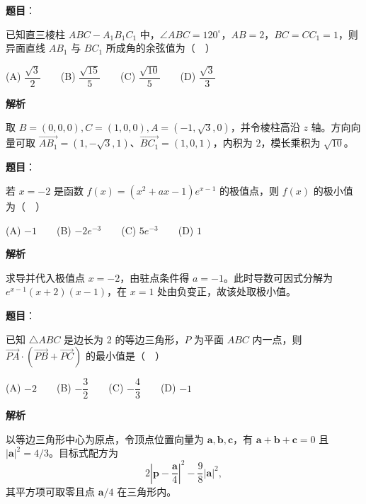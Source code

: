 \begin{answer}

\textbf{题目}：

已知直三棱柱 \(ABC-A_1B_1C_1\) 中，\(\angle ABC=120^\circ\)，\(AB=2\)，\(BC=CC_1=1\)，则异面直线 \(AB_1\) 与 \(BC_1\) 所成角的余弦值为（　）

   (A) \(\dfrac{\sqrt{3}}{2}\)　　(B) \(\dfrac{\sqrt{15}}{5}\)　　(C) \(\dfrac{\sqrt{10}}{5}\)　　(D) \(\dfrac{\sqrt{3}}{3}\)

\textbf{解析}

取 \(B=(0,0,0),C=(1,0,0),A=(-1,\sqrt3,0)\)，并令棱柱高沿 \(z\) 轴。方向向量可取 \(\overrightarrow{AB_1}=(1,-\sqrt3,1)\)、\(\overrightarrow{BC_1}=(1,0,1)\)，内积为 \(2\)，模长乘积为 \(\sqrt{10}\)。


\end{answer}
\begin{answer}

\textbf{题目}：

若 \(x=-2\) 是函数 \(f(x)=(x^2+ax-1)e^{x-1}\) 的极值点，则 \(f(x)\) 的极小值为（　）

   (A) \(-1\)　　(B) \(-2e^{-3}\)　　(C) \(5e^{-3}\)　　(D) \(1\)

\textbf{解析}

求导并代入极值点 \(x=-2\)，由驻点条件得 \(a=-1\)。此时导数可因式分解为 \(e^{x-1}(x+2)(x-1)\)，在 \(x=1\) 处由负变正，故该处取极小值。


\end{answer}
\begin{answer}

\textbf{题目}：

已知 \(\triangle ABC\) 是边长为 2 的等边三角形，\(P\) 为平面 \(ABC\) 内一点，则 \(\overrightarrow{PA}\cdot(\overrightarrow{PB}+\overrightarrow{PC})\) 的最小值是（　）

   (A) \(-2\)　　(B) \(-\dfrac{3}{2}\)　　(C) \(-\dfrac{4}{3}\)　　(D) \(-1\)

\textbf{解析}

以等边三角形中心为原点，令顶点位置向量为 \(\mathbf a,\mathbf b,\mathbf c\)，有 \(\mathbf a+\mathbf b+\mathbf c=0\) 且 \(|\mathbf a|^2=4/3\)。目标式配方为
\nopagebreak[4]
\[
2\left|\mathbf p-\frac{\mathbf a}{4}\right|^2-\frac98|\mathbf a|^2,
\]
其平方项可取零且点 \(\mathbf a/4\) 在三角形内。


\end{answer}
